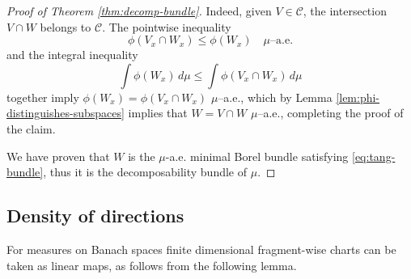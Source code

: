 \documentclass{amsart}
\numberwithin{equation}{section}
\begin{document}
\begin{proof}[Proof of Theorem \ref{thm:decomp-bundle}]
Indeed, given $V \in \mathcal C$, the intersection $V \cap W$ belongs to $\mathcal C$. The pointwise inequality
\[
\phi(V_x \cap W_x) \le  \phi(W_x) \quad \mu\text{–a.e.}
\]
and the integral inequality
\[
\int \phi(W_x)\, d\mu \le \int \phi(V_x \cap W_x)\, d\mu
\]
together imply $\phi(W_x) = \phi(V_x \cap W_x)$ $\mu$–a.e., which by Lemma \ref{lem:phi-distinguishes-subspaces} implies that $W = V \cap W$ $\mu$–a.e., completing the proof of the claim. 

We have proven that $W$ is the $\mu$-a.e. minimal Borel bundle satisfying \eqref{eq:tang-bundle}, thus it is the decomposability bundle of $\mu$.
\end{proof}


\subsection{Density of directions} 

For measures on Banach spaces finite dimensional fragment-wise charts can be taken as linear maps, as follows from the following lemma.  
\end{document}
